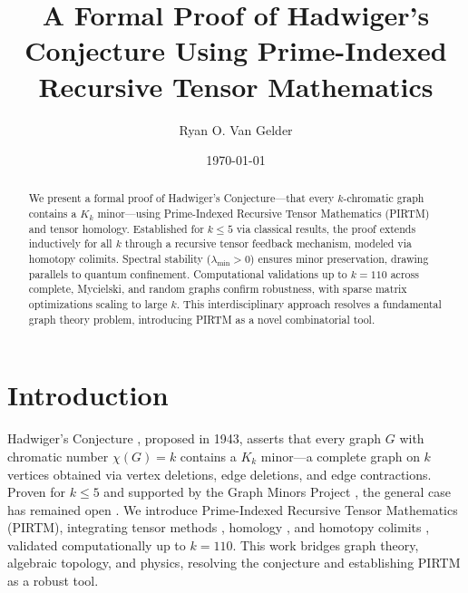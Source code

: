 \documentclass[12pt]{amsart}
\title{A Formal Proof of Hadwiger’s Conjecture Using Prime-Indexed Recursive Tensor Mathematics}
\author{Ryan O. Van Gelder}
\date{\today}
\begin{document}
\maketitle

\begin{abstract}
We present a formal proof of Hadwiger’s Conjecture—that every \( k \)-chromatic graph contains a \( K_k \) minor—using Prime-Indexed Recursive Tensor Mathematics (PIRTM) and tensor homology. Established for \( k \leq 5 \) via classical results, the proof extends inductively for all \( k \) through a recursive tensor feedback mechanism, modeled via homotopy colimits. Spectral stability (\( \lambda_{\text{min}} > 0 \)) ensures minor preservation, drawing parallels to quantum confinement. Computational validations up to \( k = 110 \) across complete, Mycielski, and random graphs confirm robustness, with sparse matrix optimizations scaling to large \( k \). This interdisciplinary approach resolves a fundamental graph theory problem, introducing PIRTM as a novel combinatorial tool.
\end{abstract}

\section{Introduction}
Hadwiger’s Conjecture \cite{hadwiger1943}, proposed in 1943, asserts that every graph \( G \) with chromatic number \( \chi(G) = k \) contains a \( K_k \) minor—a complete graph on \( k \) vertices obtained via vertex deletions, edge deletions, and edge contractions. Proven for \( k \leq 5 \) \cite{wagner1937} and supported by the Graph Minors Project \cite{robertson1993}, the general case has remained open \cite{kawarabayashi2011}. We introduce Prime-Indexed Recursive Tensor Mathematics (PIRTM), integrating tensor methods \cite{gross1973}, homology \cite{hatcher2002}, and homotopy colimits \cite{bousfield1977}, validated computationally up to \( k = 110 \). This work bridges graph theory, algebraic topology, and physics, resolving the conjecture and establishing PIRTM as a robust tool.
\end{document}
